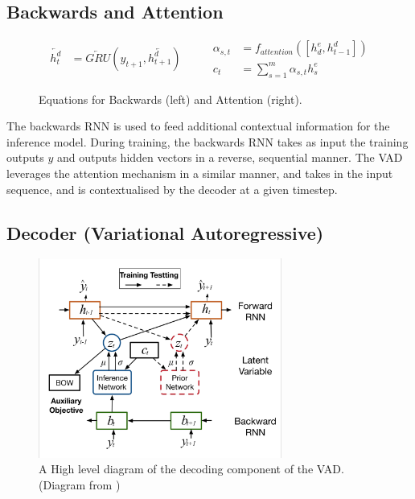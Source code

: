 \documentclass[12pt,twoside]{report}
\begin{document}
\subsection{Backwards and Attention}


\begin{figure}[!ht]
	\label{eqn:eqback}
	\begin{equation}
		\begin{split}
			\overleftarrow{h^d_t} &= \overleftarrow{GRU}(y_{t+1}, \overleftarrow{h^d_{t+1}})
		\end{split}
		\quad\quad
		\begin{split}
			\alpha_{s,t} &= f_{attention}([h^e_d, h^d_{t-1}]) \\
			c_t &= \sum^m_{s=1}\alpha_{s,t} h^e_s
		\end{split}
	\end{equation}
	\caption{Equations for Backwards (left) and Attention (right).}
	\end{figure}


The backwards RNN is used to feed additional contextual information for the inference model.  During training, the backwards RNN takes as input the training outputs $y$ and outputs hidden vectors in a reverse, sequential manner. The VAD leverages the attention mechanism in a similar manner, and takes in the input sequence, and is contextualised by the decoder at a given timestep.

\subsection{Decoder (Variational Autoregressive)}
\begin{figure}[!ht]
	\centering
	\includegraphics[width=80mm]{diagrams/vad_decoder.png}
	\caption{A High level diagram of the decoding component of the VAD. (Diagram from \cite{du_variational_2018})\label{r:vad_decoder}}
	\end{figure}
	
\end{document}
